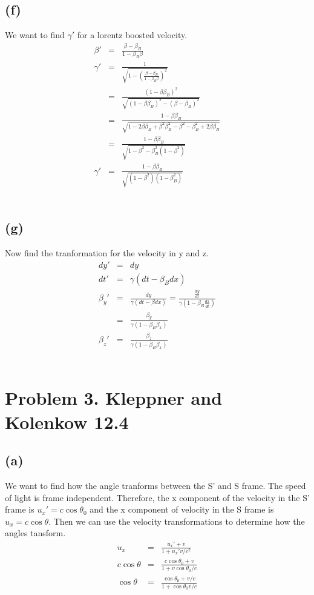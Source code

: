 \documentclass[11pt]{amsart}
\begin{document}
\subsection*{(f)} We want to find $\gamma'$ for a lorentz boosted velocity. \\
\begin{eqnarray*} 
\beta' &=& \frac{\beta-\beta_{B}}{1-\beta_{B}\beta} \\
\gamma' &=& \frac{1}{\sqrt{1-(\frac{\beta-\beta_{B}}{1-\beta_{B}\beta})^{2}}} \\
&=& \frac{(1-\beta\beta_{B})^{2}}{\sqrt{(1-\beta\beta_{B})^{2}-(\beta-\beta_{B})^{2}}} \\
&=& \frac{1-\beta\beta_{B}}{\sqrt{1-2\beta\beta_{B}+\beta^{2}\beta_{B}^{2}-\beta^{2}-\beta_{B}^{2}+2\beta\beta_{B}}} \\
&=& \frac{1-\beta\beta_{B}}{\sqrt{1-\beta^{2}-\beta_{B}^{2}(1-\beta^{2})}} \\
\gamma' &=& \frac{1-\beta\beta_{B}}{\sqrt{(1-\beta^{2})(1-\beta_{B}^{2})}} 
\end{eqnarray*} \\
\subsection*{(g)} Now find the tranformation for the velocity in y and z. \\
\begin{eqnarray*} 
dy' &=& dy \\
dt' &=& \gamma(dt-\beta_{B}{dx}) \\
\beta_{y}' &=& \frac{dy}{\gamma(dt-\beta{dx})} = \frac{\frac{dy}{dt}}{\gamma(1-\beta_{B}\frac{dx}{dt})} \\
&=& \frac{\beta_{y}}{\gamma(1-\beta_{B}\beta_{x})} \\
\beta_{z}' &=& \frac{\beta_{z}}{\gamma(1-\beta_{B}\beta_{x})} 
\end{eqnarray*} \\

\section*{Problem 3. Kleppner and Kolenkow 12.4}
\subsection*{(a)} We want to find how the angle tranforms between the S' and S frame. The speed of light is frame independent. Therefore, the x component of the velocity in the S' frame is $u_{x}'=c\cos{\theta_{0}}$ and the x component of velocity in the S frame is $u_{x}=c\cos{\theta}$. Then we can use the velocity transformations to determine how the angles tansform. \\
\begin{eqnarray*}
u_{x} &=& \frac{u_{x}'+v}{1+u_{x}'v/c^{2}} \\
c\cos{\theta} &=& \frac{c\cos{\theta_{0}}+v}{1+v\cos{\theta_{0}}/c} \\
\cos{\theta} &=& \frac{\cos{\theta_{0}}+v/c}{1+\cos{\theta_{0}}v/c} 
\end{eqnarray*} \\
\end{document}
